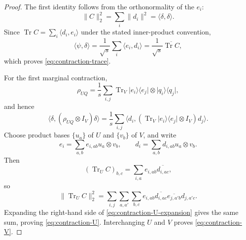 \documentclass[11pt,reqno]{amsart}
\theoremstyle{remark}
\DeclareMathOperator{\Tr}{Tr}
\newcommand{\ketbra}[2]{\lvert #1\rangle\!\langle #2\rvert}
\newcommand{\ip}[2]{\langle #1,#2\rangle}
\newcommand{\norm}[1]{\lVert #1\rVert}
\begin{document}
\begin{proof}
The first identity follows from the orthonormality of the $e_i$:
\[
    \norm{C}_2^2
    =\sum_i\norm{d_i}^2
    =\ip{\delta}{\delta}.
\]
Since $\Tr C=\sum_i\ip{d_i}{e_i}$ under the stated inner-product
convention,
\[
    \ip{\psi}{\delta}
    =\frac1{\sqrt s}\sum_i\ip{e_i}{d_i}
    =\frac1{\sqrt s}\overline{\Tr C},
\]
which proves \cref{eq:contraction-trace}.

For the first marginal contraction,
\[
    \rho_{UQ}
    =\frac1s\sum_{i,j}
      \Tr_V\ketbra{e_i}{e_j}\otimes\ketbra{q_i}{q_j},
\]
and hence
\begin{equation}
\label{eq:contraction-U-expansion}
    \ip{\delta}{(\rho_{UQ}\otimes I_V)\delta}
    =\frac1s\sum_{i,j}
      \ip{d_i}{
        (\Tr_V\ketbra{e_i}{e_j}\otimes I_V)d_j
      }.
\end{equation}
Choose product bases $\{u_a\}$ of $U$ and $\{v_b\}$ of $V$, and
write
\[
    e_i=\sum_{a,b}e_{i,ab}u_a\otimes v_b,
    \qquad
    d_i=\sum_{a,b}d_{i,ab}u_a\otimes v_b.
\]
Then
\[
    (\Tr_UC)_{b,c}
    =\sum_{i,a}e_{i,ab}\overline{d_{i,ac}},
\]
so
\[
    \norm{\Tr_UC}_2^2
    =\sum_{i,j}\sum_{a,a'}\sum_{b,c}
      e_{i,ab}\overline{d_{i,ac}}
      \overline{e_{j,a'b}}d_{j,a'c}.
\]
Expanding the right-hand side of
\cref{eq:contraction-U-expansion} gives the same sum, proving
\cref{eq:contraction-U}. Interchanging $U$ and $V$ proves
\cref{eq:contraction-V}.
\end{proof}
\end{document}
